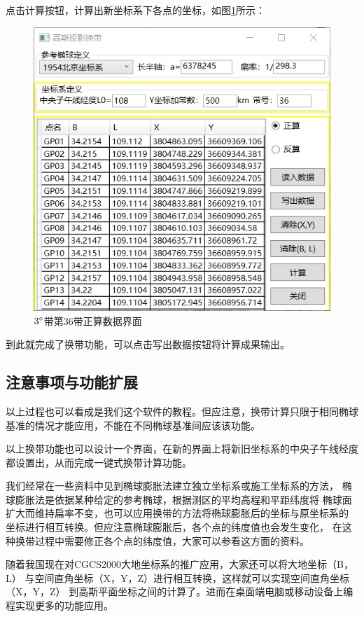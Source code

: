 点击计算按钮，计算出新坐标系下各点的坐标，如图\ref{fig:GaussProjUI06}所示：
\begin{figure}[htbp]
    \centering
    \includegraphics[scale=0.8]{gaussProj/UI06.png}
    \caption{$3^\circ$带第36带正算数据界面}
    \label{fig:GaussProjUI06}
\end{figure}

到此就完成了换带功能，可以点击写出数据按钮将计算成果输出。

\subsection{注意事项与功能扩展}

以上过程也可以看成是我们这个软件的教程。但应注意，换带计算只限于相同椭球
基准的情况才能应用，不能在不同椭球基准间应该该功能。

以上换带功能也可以设计一个界面，在新的界面上将新旧坐标系的中央子午线经度
都设置出，从而完成一键式换带计算功能。

我们经常在一些资料中见到椭球膨胀法建立独立坐标系或施工坐标系的方法，
椭球膨胀法是依据某种给定的参考椭球，根据测区的平均高程和平距纬度将
椭球面扩大而维持扁率不变，也可以应用换带的方法将椭球膨胀后的坐标与原坐标系的
坐标进行相互转换。但应注意椭球膨胀后，各个点的纬度值也会发生变化，
在这种换带过程中需要修正各个点的纬度值，大家可以参看这方面的资料。

随着我国现在对CGCS2000大地坐标系的推广应用，大家还可以将大地坐标（B，L）
与空间直角坐标（X，Y，Z）进行相互转换，这样就可以实现空间直角坐标（X，Y，Z）
到高斯平面坐标之间的计算了。进而在桌面端电脑或移动设备上编程实现更多的功能应用。


